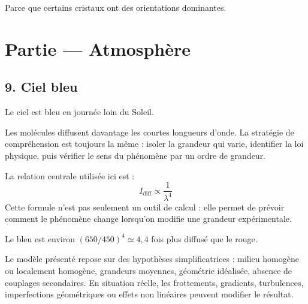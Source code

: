 \documentclass[11pt,a4paper]{article}
\begin{document}
\begin{corrigebox}[Indication]
Parce que certains cristaux ont des orientations dominantes.
\end{corrigebox}


\section{Partie — Atmosphère}


\subsection{9. Ciel bleu}

\begin{exemplebox}
Le ciel est bleu en journée loin du Soleil.
\end{exemplebox}

\begin{methodebox}
Les molécules diffusent davantage les courtes longueurs d'onde.
La stratégie de compréhension est toujours la même : isoler la grandeur qui varie, identifier la loi physique, puis vérifier le sens du phénomène par un ordre de grandeur.
\end{methodebox}

\begin{theorembox}
La relation centrale utilisée ici est :
\[
I_{\mathrm{diff}}\propto \frac{1}{\lambda^4}
\]
Cette formule n'est pas seulement un outil de calcul : elle permet de prévoir comment le phénomène change lorsqu'on modifie une grandeur expérimentale.
\end{theorembox}

\begin{odgbox}
Le bleu est environ $(650/450)^4\simeq4{,}4$ fois plus diffusé que le rouge.
\end{odgbox}

\begin{attentionbox}
Le modèle présenté repose sur des hypothèses simplificatrices : milieu homogène ou localement homogène, grandeurs moyennes, géométrie idéalisée, absence de couplages secondaires. En situation réelle, les frottements, gradients, turbulences, imperfections géométriques ou effets non linéaires peuvent modifier le résultat.
\end{attentionbox}
\end{document}
